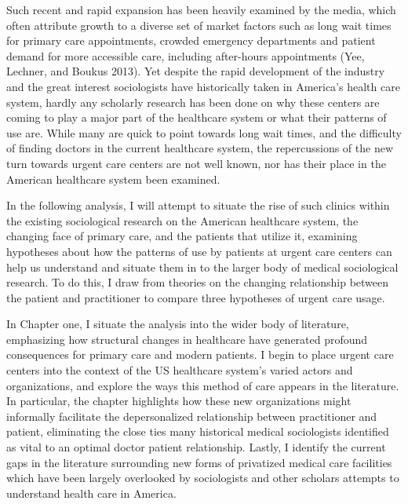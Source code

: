 \documentclass[12pt,twoside]{reedthesis}
\begin{document}
  Such recent and rapid expansion has been heavily examined by the media,
  which often attribute growth to a diverse set of market factors such as
  long wait times for primary care appointments, crowded emergency
  departments and patient demand for more accessible care, including
  after-hours appointments (Yee, Lechner, and Boukus 2013). Yet despite
  the rapid development of the industry and the great interest
  sociologists have historically taken in America's health care system,
  hardly any scholarly research has been done on why these centers are
  coming to play a major part of the healthcare system or what their
  patterns of use are. While many are quick to point towards long wait
  times, and the difficulty of finding doctors in the current healthcare
  system, the repercussions of the new turn towards urgent care centers
  are not well known, nor has their place in the American healthcare
  system been examined.
  
  In the following analysis, I will attempt to situate the rise of such
  clinics within the existing sociological research on the American
  healthcare system, the changing face of primary care, and the patients
  that utilize it, examining hypotheses about how the patterns of use by
  patients at urgent care centers can help us understand and situate them
  in to the larger body of medical sociological research. To do this, I
  draw from theories on the changing relationship between the patient and
  practitioner to compare three hypotheses of urgent care usage.
  
  In Chapter one, I situate the analysis into the wider body of
  literature, emphasizing how structural changes in healthcare have
  generated profound consequences for primary care and modern patients. I
  begin to place urgent care centers into the context of the US healthcare
  system's varied actors and organizations, and explore the ways this
  method of care appears in the literature. In particular, the chapter
  highlights how these new organizations might informally facilitate the
  depersonalized relationship between practitioner and patient,
  eliminating the close ties many historical medical sociologists
  identified as vital to an optimal doctor patient relationship. Lastly, I
  identify the current gaps in the literature surrounding new forms of
  privatized medical care facilities which have been largely overlooked by
  sociologists and other scholars attempts to understand health care in
  America.
  
\end{document}

